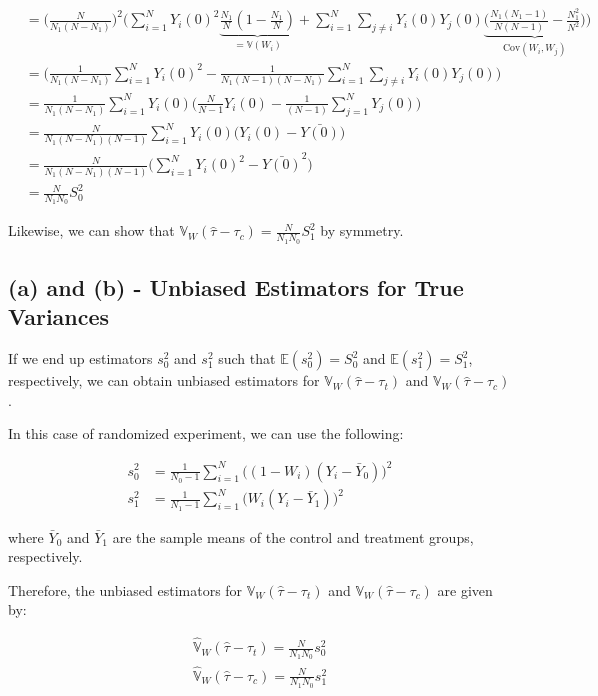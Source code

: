 \documentclass[11pt]{article}
\numberwithin{equation}{section}
\newcommand{\E}{\mathbb{E}}
\newcommand{\Var}{\mathbb{V}}
\begin{document}
\begin{align*}
    &= \biggl(\frac{N}{N_1(N-N_1)}\biggr)^2\biggl(\sum_{i=1}^NY_i(0)^2\underbrace{\frac{N_1}{N}(1-\frac{N_1}{N})}_{=\Var(W_i)} + \sum_{i=1}^N\sum_{j\neq i} Y_i(0)Y_j(0)\underbrace{\biggl(\frac{N_1(N_1-1)}{N(N-1)} - \frac{N_1^2}{N^2}\biggr)}_{\mathrm{Cov}(W_i, W_j)}\biggr)\\
    &= \biggl(\frac{1}{N_1(N-N_1)}\sum_{i=1}^NY_i(0)^2 - \frac{1}{N_1(N-1)(N-N_1)}\sum_{i=1}^N\sum_{j\neq i} Y_i(0)Y_j(0)\biggr)\\
    &= \frac{1}{N_1(N-N_1)}\sum_{i=1}^N Y_i(0)\biggl(\frac{N}{N-1}Y_i(0) - \frac{1}{(N-1)} \sum_{j=1}^N Y_j(0)\biggr)\\
    &= \frac{N}{N_1(N-N_1)(N-1)}\sum_{i=1}^N Y_i(0)\biggl(Y_i(0) - \bar{Y(0)} \biggr)\\
    &= \frac{N}{N_1(N-N_1)(N-1)}\biggl(\sum_{i=1}^N Y_i(0)^2 - \bar{Y(0)}^2 \biggr)\\
    &= \frac{N}{N_1N_0}S_0^2
\end{align*}


Likewise, we can show that $\Var_W(\hat\tau - \tau_c) = \frac{N}{N_1N_0}S_1^2$ by symmetry.

\subsection*{(a) and (b) - Unbiased Estimators for True Variances}

If we end up estimators $s_0^2$ and $s_1^2$ such that $\E(s_0^2) = S_0^2$ and $\E(s_1^2) = S_1^2$, respectively, we can obtain unbiased estimators for $\Var_W(\hat\tau - \tau_t)$ and $\Var_W(\hat\tau - \tau_c)$.

In this case of randomized experiment, we can use the following:

\begin{align}
    s_0^2 &= \frac{1}{N_0-1}\sum_{i=1}^N \bigl((1-W_i)(Y_i - \bar{Y}_0)\bigr)^2\label{eq:s_0^2}\\
    s_1^2 &= \frac{1}{N_1-1}\sum_{i=1}^N \bigl(W_i(Y_i - \bar{Y}_1)\bigr)^2\label{eq:s_1^2}
\end{align}

where $\bar{Y}_0$ and $\bar{Y}_1$ are the sample means of the control and treatment groups, respectively.


Therefore, the unbiased estimators for $\Var_W(\hat\tau - \tau_t)$ and $\Var_W(\hat\tau - \tau_c)$ are given by:

\begin{align}
    \hat{\Var}_W(\hat\tau - \tau_t) = \frac{N}{N_1N_0}s_0^2\label{eq:hat_var_tau_t}\\
    \hat{\Var}_W(\hat\tau - \tau_c) = \frac{N}{N_1N_0}s_1^2\label{eq:hat_var_tau_c}
\end{align}
\end{document}
